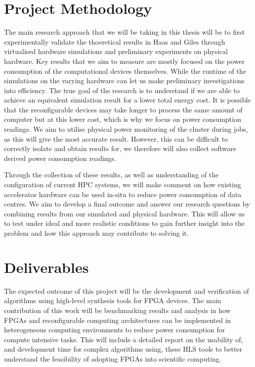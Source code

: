 \documentclass[11pt, a4paper]{article}
\begin{document}
	\section{Project Methodology}
	The main research approach that we will be taking in this thesis will be to first experimentally validate the thoeretical results in Haas and Giles \cite{haasNestedMLMCFramework2025} through virtualised hardware simulations and preliminary experiments on physical hardware. Key results that we aim to measure are mostly focused on the power consumption of the computational devices themselves. While the runtime of the simulations on the varying hardware can let us make preliminary investigations into efficiency. The true goal of the research is to understand if we are able to achieve an equivalent simulation result for a lower total energy cost. It is possible that the reconfigurable devices may take longer to process the same amount of computer but at this lower cost, which is why we focus on power consumption readings. We aim to utilise physical power monitoring of the cluster during jobs, as this will give the most accurate result. However, this can be difficult to correctly isolate and obtain results for, we therefore will also collect software derived power consumption readings. 
	
	Through the collection of these results, as well as understanding of the configuration of current HPC systems, we will make comment on how existing accelerator hardware can be used in-situ to reduce power consumption of data centres. We aim to develop a final outcome and answer our research questions by combining results from our simulated and physical hardware. This will allow us to test under ideal and more realistic conditions to gain further insight into the problem and how this approach may contribute to solving it. 
	
	\section{Deliverables}
	The expected outcome of this project will be the development and verification of algorithms using high-level synthesis tools for FPGA devices. The main contribution of this work will be benchmarking results and analysis in how FPGAs and reconfigurable computing architectures can be implemented in heterogeneous computing environments to reduce power consumption for compute intensive tasks. This will include a detailed report on the usability of, and development time for complex algorithms using, these HLS tools to better understand the feasibility of adopting FPGAs into scientific computing. 
	
\end{document}
